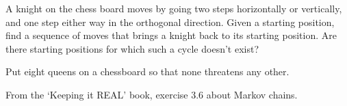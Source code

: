 \begin{exercise}
  A knight on the chess board moves by going two steps horizontally or
  vertically, and one step either way in the orthogonal
  direction. Given a starting position, find a sequence of moves that
  brings a knight back to its starting position. Are there starting
  positions for which such a cycle doesn't exist?
\end{exercise}

\begin{exercise}
  Put eight queens on a chessboard so that none threatens any other.
\end{exercise}

\begin{exercise}
  From the `Keeping it REAL' book, exercise 3.6 about Markov chains.
\end{exercise}
